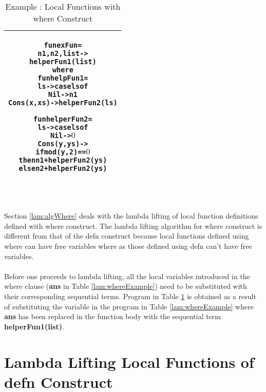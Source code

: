 \documentclass[11pt]{article}
\begin{document}
\begin{table}[h!]
\begin{center}
\begin{tabular}{|c|} \hline
\begin{minipage}{3.8in}
\begin{alltt}


  fun exFun = 
      n1,n2,list -> 
           helperFun1 (list)
        where
          fun helpFun1 = 
              ls -> case ls of 
                      Nil -> n1
                      Cons(x,xs) -> helperFun2(ls)

          fun helperFun2 =
              ls -> case ls of
                      Nil -> \(0\)
                      Cons(y,ys) ->
                        if mod(y,2) == \(0\) 
                          then n1 + helperFun2(ys)
                          else n2 + helperFun2(ys) 

\end{alltt} 
\end {minipage} 
\tabularnewline
\hline
\end{tabular}
\caption{Example : Local Functions with {\sf where} Construct}
\label{lam:whereExVarsubs}
\end{center}
\end{table}
~~\\~~\\
Section \ref {lam:algWhere} deals with the lambda lifting of local function definitions defined with {\sf where} construct. The lambda lifting algorithm for {\sf where} construct is different from that of the {\sf defn} construct because local functions defined using {\sf where} can have free variables where as those defined using {\sf defn} can't have free variables.
~~\\~~\\
Before one proceeds to lambda lifting, all the local variables introduced in the {\sf where} clause ({\bf ans} in Table \ref {lam:whereExample}) need to be substituted with their corresponding sequential terms. Program in Table \ref {lam:whereExVarsubs} is obtained as a result of substituting the variable in the program in Table \ref {lam:whereExample} where {\bf ans} has been replaced in the function body with the sequential term {\bf helperFun1(list)}.

\section {Lambda Lifting Local Functions of defn Construct}\label{lam:algDefn}
\end{document}
